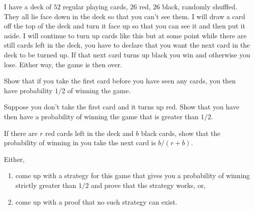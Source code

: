 \documentclass[12pt,twoside]{article}
\begin{document}
\begin{problem}{21}

  I have a deck of $52$ regular playing cards, $26$ red, $26$ black,
  randomly shuffled.  They all lie face down in the deck so that you
  can't see them.  I will draw a card off the top of the deck and turn
  it face up so that you can see it and then put it aside. I will
  continue to turn up cards like this but at some point while there
  are still cards left in the deck, you have to declare that you want
  the next card in the deck to be turned up.  If that next card turns
  up black you win and otherwise you lose.  Either way, the game is
  then over.

\bparts

 Show that if you take the first card before you have seen any
cards, you then have probability $1/2$ of winning the game.


 Suppose you don't take the first card and it turns up red.
Show that you have then have a probability of winning the game that is
greater than $1/2$.


 If there are $r$ red cards left in the deck and $b$ black
cards, show that the probability of winning in you take the next card
is $b/(r+b)$.


 Either,
\begin{enumerate}
\item come up with a strategy for this game that gives you a
  probability of winning strictly greater than $1/2$ and prove that
  the strategy works, or,
\item come up with a proof that no such strategy can exist.
\end{enumerate}


\end{problem}
\end{document}
